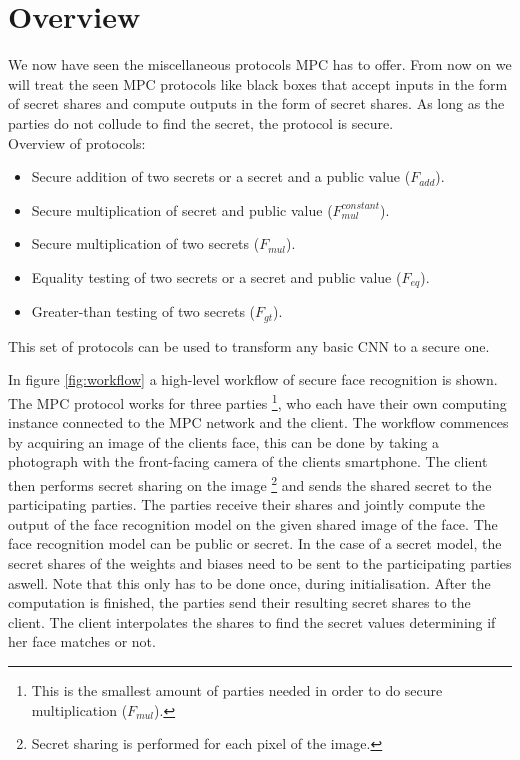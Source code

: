 \section{Overview}
We now have seen the miscellaneous protocols MPC has to offer. From now on we will treat the seen MPC protocols like black boxes that accept inputs in the form of secret shares and compute outputs in the form of secret shares. As long as the parties do not collude to find the secret, the protocol is secure.\\
Overview of protocols:
\begin{itemize}
  \item Secure addition of two secrets or a secret and a public value ($F_{add}$).
  \item Secure multiplication of secret and public value ($F_{mul}^{constant}$).
  \item Secure multiplication of two secrets ($F_{mul}$).
  \item Equality testing of two secrets or a secret and public value ($F_{eq}$).
  \item Greater-than testing of two secrets ($F_{gt}$).
\end{itemize}

This set of protocols can be used to transform any basic CNN to a secure one.

In figure \ref{fig:workflow} a high-level workflow of secure face recognition is shown. The MPC protocol works for three parties \footnote{This is the smallest amount of parties needed in order to do secure multiplication ($F_{mul}$).}, who each have their own computing instance connected to the MPC network and the client. The workflow commences by acquiring an image of the clients face, this can be done by taking a photograph with the front-facing camera of the clients smartphone. The client then performs secret sharing on the image \footnote{Secret sharing is performed for each pixel of the image.} and sends the shared secret to the participating parties. The parties receive their shares and jointly compute the output of the face recognition model on the given shared image of the face. The face recognition model can be public or secret. In the case of a secret model, the secret shares of the weights and biases need to be sent to the participating parties aswell. Note that this only has to be done once, during initialisation. After the computation is finished, the parties send their resulting secret shares to the client. The client interpolates the shares to find the secret values determining if her face matches or not.


